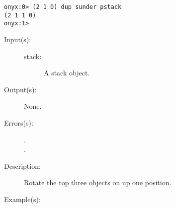 \begin{description}
\begin{description}
\begin{verbatim}
onyx:0> (2 1 0) dup sunder pstack
(2 1 1 0)
onyx:1>
		\end{verbatim}
	\end{description}
\label{systemdict:sup}
\item[{\onyxop{stack}{sup}{--}}: ]
	\begin{description}\item[]
	\item[Input(s): ]
		\begin{description}\item[]
		\item[stack: ]
			A stack object.
		\end{description}
	\item[Output(s): ] None.
	\item[Errors(s): ]
		\begin{description}\item[]
		\item[.]
		\item[.]
		\end{description}
	\item[Description: ]
		Rotate the top three objects on  up one position.
	\item[Example(s): ]\begin{verbatim}


\end{verbatim}
\end{description}
\end{description}
